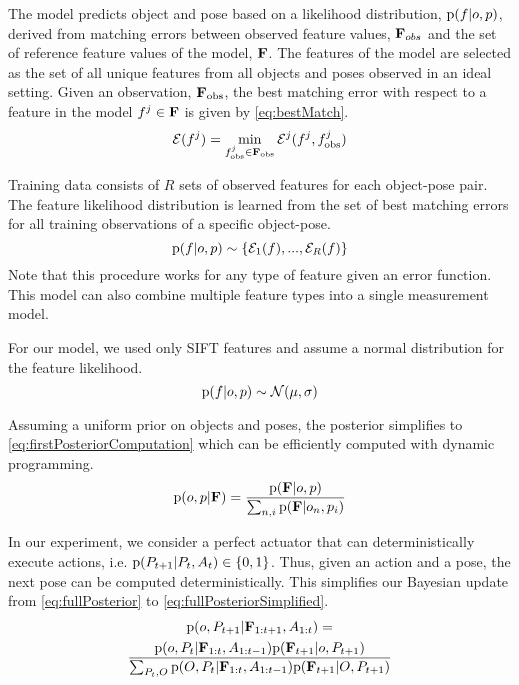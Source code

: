             The model predicts object and pose based on a likelihood distribution, $\text{p}(f|o,p)$, derived from matching errors between observed feature values, $\mathbf{F}_{obs}$ and the set of reference feature values of the model, $\mathbf{F}$. The features of the model are selected as the set of all unique features from all objects and poses observed in an ideal setting. Given an observation, $\mathbf{F}_{\text{obs}}$, the best matching error with respect to a feature in the model $f^j \in \mathbf{F}$ is given by \eqref{eq:bestMatch}.
            \begin{equation}
                \label{eq:bestMatch}
                \cursive{E}(f^j) = \min_{f^j_{\text{obs}} \in \set{F}_{\text{obs}}}\cursive{E}^j(f^j,f^j_{\text{obs}})
            \end{equation}
            
            Training data consists of $R$ sets of observed features for each object-pose pair. The feature likelihood distribution is learned from the set of best matching errors for all training observations of a specific object-pose.
            \begin{equation}
                \text{p}(f|o,p) \sim \{\mathcal{E}_1(f), ...,  \mathcal{E}_R(f)\}
            \end{equation}
            Note that this procedure works for any type of feature given an error function. This model can also combine multiple feature types into a single measurement model. 

            For our model, we used only SIFT features and assume a normal distribution for the feature likelihood.   
            \begin{equation}
                \text{p}(f|o,p) \sim \mathcal{N}(\mu,\sigma)
            \end{equation}

            Assuming a uniform prior on objects and poses, the posterior simplifies to \eqref{eq:firstPosteriorComputation} which can be efficiently computed with dynamic programming.
            \begin{equation}
                \label{eq:firstPosteriorComputation}
                \prob{o,p|\set{F}} = \frac{\prob{\set{F}|o,p}}{\sum_{n,i} \prob{\set{F}|o_n,p_i}}
            \end{equation}

            In our experiment, we consider a perfect actuator that can deterministically execute actions, i.e. $\text{p}(P_{t+1}|P_t,A_t) \in \{ 0 , 1 \}$. Thus, given an action and a pose, the next pose can be computed deterministically. This simplifies our Bayesian update from \eqref{eq:fullPosterior} to \eqref{eq:fullPosteriorSimplified}.
            {\small
            \begin{multline}
                \label{eq:fullPosteriorSimplified}
                \prob{o,P_{t+1}|\set{F}_{1:t+1},A_{1:t}} = \\ \frac{\prob{o,P_t|\set{F}_{1:t},A_{1:t-1}} \prob{\set{F}_{t+1}|o,P_{t+1}} }{\sum_{P_t,O} \prob{O,P_t|\set{F}_{1:t},A_{1:t-1}} \prob{\set{F}_{t+1}|O,P_{t+1}} }
            \end{multline}
            }

